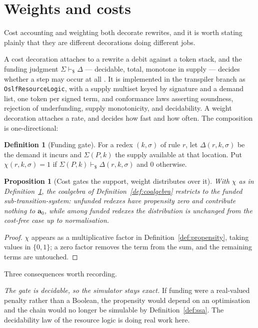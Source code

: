 \documentclass[11pt,a4paper]{article}
\theoremstyle{plain}
\newtheorem{proposition}[theorem]{Proposition}
\theoremstyle{definition}
\newtheorem{definition}[theorem]{Definition}
\theoremstyle{remark}
\newcommand{\prop}{\mathbf{a}}
\newcommand{\funds}{\mathrel{\vdash_{\!\$}}}
\begin{document}
\section{Weights and costs}
\label{sec:cost}

Cost accounting and weighting both decorate rewrites, and it is worth stating plainly that they are
different decorations doing different jobs.

A cost decoration attaches to a rewrite a debit against a token stack, and the funding judgment
$\Sigma \funds \Delta$ --- decidable, total, monotone in supply --- decides whether a step may occur
at all \cite{costmonad}. It is implemented in the transpiler branch as
\texttt{OslfResourceLogic}, with a supply multiset keyed by signature and a demand list, one token
per signed term, and conformance laws asserting soundness, rejection of underfunding, supply
monotonicity, and decidability. A weight decoration attaches a rate, and decides how fast and how
often. The composition is one-directional:

\begin{definition}[Funding gate]
\label{def:gate}
For a redex $(k,\sigma)$ of rule $r$, let $\Delta(r,k,\sigma)$ be the demand it incurs and
$\Sigma(P,k)$ the supply available at that location. Put
$\chi(r,k,\sigma) = 1$ if $\Sigma(P,k) \funds \Delta(r,k,\sigma)$ and $0$ otherwise.
\end{definition}

\begin{proposition}[Cost gates the support, weight distributes over it]
\label{prop:gate}
With $\chi$ as in Definition~\ref{def:gate}, the coalgebra of Definition~\ref{def:coalgebra}
restricts to the funded sub-transition-system: unfunded redexes have propensity zero and contribute
nothing to $\prop_0$, while among funded redexes the distribution is unchanged from the
cost-free case up to normalisation.
\end{proposition}

\begin{proof}
$\chi$ appears as a multiplicative factor in Definition~\ref{def:propensity}, taking values in
$\{0,1\}$; a zero factor removes the term from the sum, and the remaining terms are untouched.
\end{proof}

Three consequences worth recording.

\emph{The gate is decidable, so the simulator stays exact.} If funding were a real-valued penalty
rather than a Boolean, the propensity would depend on an optimisation and the chain would no longer
be simulable by Definition~\ref{def:ssa}. The decidability law of the resource logic is doing real
work here.
\end{document}
